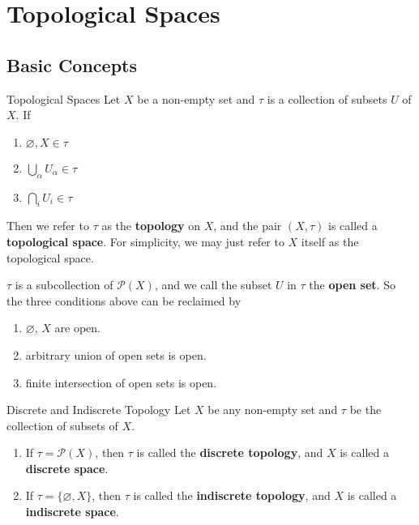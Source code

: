 \section{Topological Spaces}

\subsection{Basic Concepts}\label{sub:Basic Concepts} %

\begin{definition}{Topological Spaces}{}
    \label{def:Topological Spaces}
    Let $X$ be a non-empty set and $\tau$ is a collection of subsets
    $U$ of $X$. If

    \begin{enumerate}

        \item $\varnothing, X \in \tau$
        \item $\bigcup_{\alpha} U_{\alpha} \in \tau$
        \item $\bigcap_{i} U_{i} \in \tau$

    \end{enumerate}
    Then we refer to $\tau$ as the \textbf{topology} on $X$, and the pair
    $(X,\tau)$ is called a \textbf{topological space}. For
    simplicity, we may just refer to $X$ itself as the
    topological space.
\end{definition}

\begin{remarks}
    $\tau$ is a subcollection of $\mathcal{P}(X)$, and we call the subset
    $U$ in $\tau$ the \textbf{open set}. So the three conditions
    above can be reclaimed by
    \begin{enumerate}
        \item $\varnothing$, $X$ are open.
        \item arbitrary union of open sets is open.
        \item finite intersection of open sets is open.
    \end{enumerate}
\end{remarks}

\begin{definition}{Discrete and Indiscrete Topology}{}
    Let $X$ be any non-empty set and $\tau$ be the collection of
    subsets of $X$.
    \begin{enumerate}

        \item If $\tau = \mathcal{P}(X)$, then $\tau$ is called the
            \textbf{discrete topology}, and $X$ is called a
            \textbf{discrete space}.
        \item If $\tau = \{\varnothing, X\}$, then $\tau$ is called the
            \textbf{indiscrete topology}, and $X$ is called a
            \textbf{indiscrete space}.

    \end{enumerate}
\end{definition}

